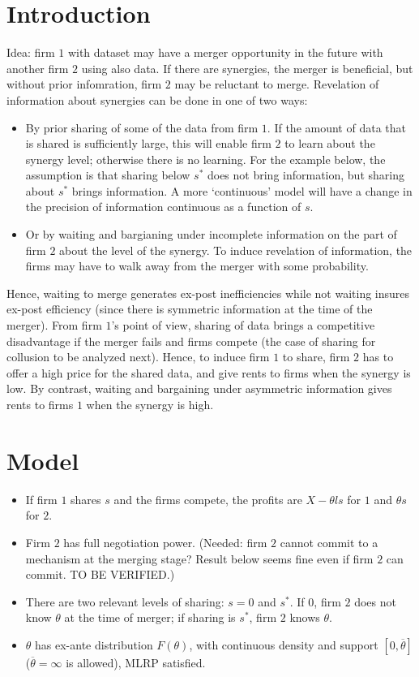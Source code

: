 \documentclass[a4paper]{article}
\renewcommand{\t}{\theta}
\begin{document}
\section{Introduction}
Idea: firm $1$ with dataset may have a merger opportunity in the future with another firm $2$ using also data. If there are synergies, the merger is beneficial, but without prior infomration, firm $2$ may be reluctant to merge. Revelation of information about synergies can be done in one of two ways:
\begin{itemize}
  \item By prior sharing of some of the data from firm $1$. If the amount of data that is shared is sufficiently large, this will enable firm $2$ to learn about the synergy level; otherwise there is no learning. For the example below, the assumption is that sharing below $s^*$ does not bring information, but sharing about $s^*$ brings information. A more `continuous' model will have a change in the precision of information continuous as a function of $s$.
  \item Or by waiting and bargianing under incomplete information on the part of firm $2$ about the level of the synergy. To induce revelation of information, the firms may have to walk away from the merger with some probability.
\end{itemize}
Hence, waiting to merge generates ex-post inefficiencies while not waiting insures ex-post efficiency (since there is symmetric information at the time of the merger). From firm $1$'s point of view, sharing of data brings a competitive disadvantage if the merger fails and firms compete (the case of sharing for collusion to be analyzed next). Hence, to induce firm $1$ to share, firm $2$ has to offer a high price for the shared data, and give rents to firms when the synergy is low. By contrast, waiting and bargaining under asymmetric information gives rents to firms $1$ when the synergy is high.

\section{Model}
\begin{itemize}
  \item If firm $1$ shares $s$ and the firms compete, the profits are $X-\t l s$ for $1$ and $\t s$ for $2$.
  \item Firm $2$ has full negotiation power. (Needed: firm $2$ cannot commit to a mechanism at the merging stage? Result below seems fine even if firm $2$ can commit. TO BE VERIFIED.) 
  \item There are two relevant levels of sharing: $s=0$ and $s^*$. If $0$, firm $2$ does not know $\t$ at the time of merger; if sharing is $s^*$, firm $2$ knows $\t$.
  \item $\t$ has ex-ante distribution $F(\t)$, with continuous density and support $[0,\overline \t]$ ($\overline \t=\infty$ is allowed), MLRP satisfied.
\end{itemize}
\end{document}
